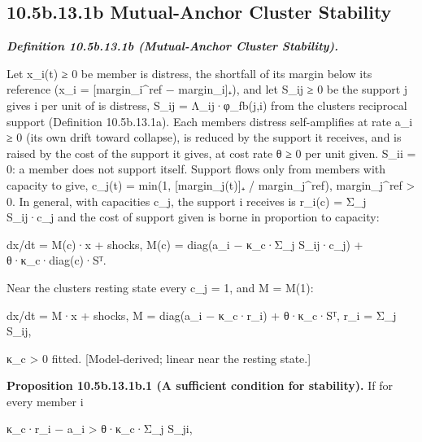 \documentclass[
]{article}
\begin{document}
\hypertarget{b.13.1b-mutual-anchor-cluster-stability}{%
\subsection{10.5b.13.1b Mutual-Anchor Cluster
Stability}\label{b.13.1b-mutual-anchor-cluster-stability}}

\emph{\textbf{Definition 10.5b.13.1b (Mutual-Anchor Cluster
Stability).}}

Let x\_i(t) ≥ 0 be member i\textquotesingle s distress, the shortfall of
its margin below its reference (x\_i = {[}margin\_i\^{}ref −
margin\_i{]}₊), and let S\_ij ≥ 0 be the support j gives i per unit of
i\textquotesingle s distress, S\_ij = Λ\_ij·φ\_fb(j,i) from the
cluster\textquotesingle s reciprocal support (Definition 10.5b.13.1a).
Each member\textquotesingle s distress self-amplifies at rate a\_i ≥ 0
(its own drift toward collapse), is reduced by the support it receives,
and is raised by the cost of the support it gives, at cost rate θ ≥ 0
per unit given. S\_ii = 0: a member does not support itself. Support
flows only from members with capacity to give, c\_j(t) = min(1,
{[}margin\_j(t){]}₊ / margin\_j\^{}ref), margin\_j\^{}ref \textgreater{}
0. In general, with capacities c\_j, the support i receives is r\_i(c) =
Σ\_j S\_ij·c\_j and the cost of support given is borne in proportion to
capacity:

dx/dt = M(c)·x + shocks, M(c) = diag(a\_i − κ\_c·Σ\_j S\_ij·c\_j) +
θ·κ\_c·diag(c)·Sᵀ.

Near the cluster\textquotesingle s resting state every c\_j = 1, and M =
M(1):

dx/dt = M·x + shocks, M = diag(a\_i − κ\_c·r\_i) + θ·κ\_c·Sᵀ, r\_i =
Σ\_j S\_ij,

κ\_c \textgreater{} 0 fitted. {[}Model-derived; linear near the resting
state.{]}

\textbf{Proposition 10.5b.13.1b.1 (A sufficient condition for
stability).} If for every member i

κ\_c·r\_i − a\_i \textgreater{} θ·κ\_c·Σ\_j S\_ji,
\end{document}
